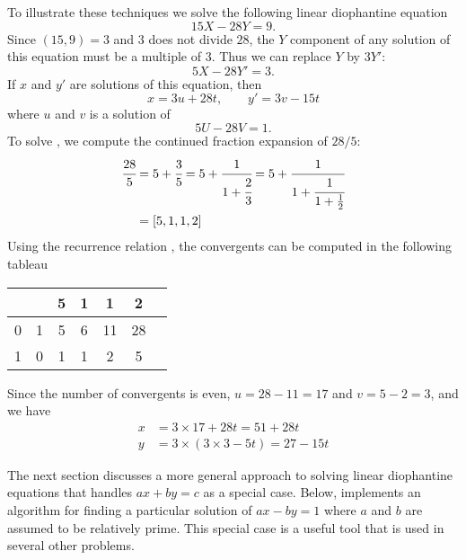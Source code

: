 To illustrate these techniques we solve the following linear
diophantine equation
\[
15 X - 28 Y = 9.
\]
Since $(15, 9) = 3$ and $3$ does not divide $28$, the $Y$ component of
any solution of this equation must be a multiple of $3$. Thus we can
replace $Y$ by $3 Y'$:
\[
5 X - 28 Y' = 3.
\]
If $x$ and $y'$ are solutions of this equation, then 
\[
x = 3 u + 28t, \qquad y' = 3 v - 15t
\]
where $u$ and $v$ is a solution of 
\begin{equation} \label{Dio:2Linear:Eqa}
5 U - 28 V = 1.
\end{equation}
To solve , we compute the continued fraction
expansion of $28/5$:
\[
\begin{aligned}
\cfrac{28}{5} & = 5 + \cfrac{3}{5} = 5 + \cfrac{1}{1 + \cfrac{2}{3}}
=  5 + \cfrac{1}{1 + \cfrac{1}{1 + \frac{1}{2}}}\\
& = [5, 1, 1,  2]
\end{aligned}
\]
Using the recurrence relation , the convergents
can be computed in the following tableau
\begin{center}
\begin{tabular}{|c|c|c|c|c|c|c|}
\multicolumn{2}{c}{} & \multicolumn{1}{c}{5} & \multicolumn{1}{c}{1} 
 & \multicolumn{1}{c}{1} & \multicolumn{1}{c}{2} \\ \hline
0 & 1 & 5 & 6 & 11 & 28 \\ \hline
1 & 0 & 1 & 1 &  2 &  5 \\ \hline
\end{tabular}
\end{center}
Since the number of convergents is even, $u = 28 -11 = 17$ and 
$v = 5 - 2 = 3$, and we have 
\[
\begin{aligned}
  x & =  3 \times 17 + 28t =  51 + 28 t\\
  y & =  3 \times (3 \times 3 - 5t) = 27 - 15t
\end{aligned}
\]

\medskip
The next section discusses a more general approach to solving linear
diophantine equations that handles $ax +by=c$ as a special case.
Below,  implements an algorithm for finding a
particular solution of $ax-by=1$ where $a$ and $b$ are assumed to be
relatively prime.  This special case is a useful tool that is
used in several other problems.

